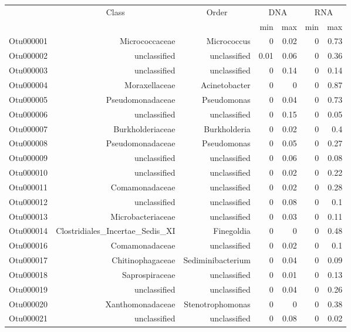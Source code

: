 \begin{table}[ht]
\centering
\begin{tabular}{crrrrrr}
  \hline
  & \multicolumn{1}{c}{Class} & \multicolumn{1}{c}{Order} & 
                      \multicolumn{2}{c}{DNA} & \multicolumn{2}{c}{RNA} \\
 & &  & min & max & min & max \\
 \hline
Otu000001 & Micrococcaceae & Micrococcus & 0 & 0.02 & 0 & 0.73 \\ 
  Otu000002 & unclassified & unclassified & 0.01 & 0.06 & 0 & 0.36 \\ 
  Otu000003 & unclassified & unclassified & 0 & 0.14 & 0 & 0.14 \\ 
  Otu000004 & Moraxellaceae & Acinetobacter & 0 & 0 & 0 & 0.87 \\ 
  Otu000005 & Pseudomonadaceae & Pseudomonas & 0 & 0.04 & 0 & 0.73 \\ 
  Otu000006 & unclassified & unclassified & 0 & 0.15 & 0 & 0.05 \\ 
  Otu000007 & Burkholderiaceae & Burkholderia & 0 & 0.02 & 0 & 0.4 \\ 
  Otu000008 & Pseudomonadaceae & Pseudomonas & 0 & 0.05 & 0 & 0.27 \\ 
  Otu000009 & unclassified & unclassified & 0 & 0.06 & 0 & 0.08 \\ 
  Otu000010 & unclassified & unclassified & 0 & 0.02 & 0 & 0.22 \\ 
  Otu000011 & Comamonadaceae & unclassified & 0 & 0.02 & 0 & 0.28 \\ 
  Otu000012 & unclassified & unclassified & 0 & 0.08 & 0 & 0.1 \\ 
  Otu000013 & Microbacteriaceae & unclassified & 0 & 0.03 & 0 & 0.11 \\ 
  Otu000014 & Clostridiales\_Incertae\_Sedis\_XI & Finegoldia & 0 & 0 & 0 & 0.48 \\ 
  Otu000016 & Comamonadaceae & unclassified & 0 & 0.02 & 0 & 0.1 \\ 
  Otu000017 & Chitinophagaceae & Sediminibacterium & 0 & 0.04 & 0 & 0.09 \\ 
  Otu000018 & Saprospiraceae & unclassified & 0 & 0.01 & 0 & 0.13 \\ 
  Otu000019 & unclassified & unclassified & 0 & 0.04 & 0 & 0.26 \\ 
  Otu000020 & Xanthomonadaceae & Stenotrophomonas & 0 & 0 & 0 & 0.38 \\ 
  Otu000021 & unclassified & unclassified & 0 & 0.08 & 0 & 0.02 \\ 

\end{tabular}
\end{table}
